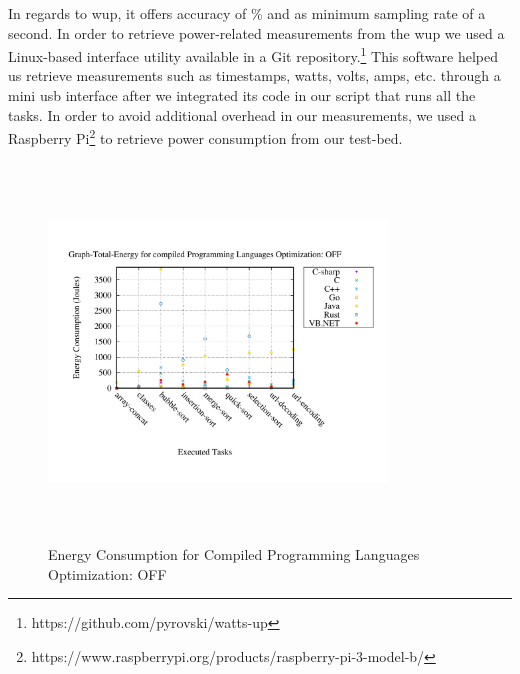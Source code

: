 In regards to {\sc wup}, it offers accuracy of \% and 
as minimum sampling rate of a second. 
In order to retrieve power-related measurements from the {\sc wup} 
we used a Linux-based interface utility available in a Git 
repository.\footnote{https://github.com/pyrovski/watts-up}
This software helped us retrieve measurements such as timestamps, 
watts, volts, amps, etc. through a mini {\sc usb} interface after 
we integrated its code in our script that runs all the tasks. 
In order to avoid additional overhead in our measurements, we 
used a Raspberry Pi\footnote{https://www.raspberrypi.org/products/raspberry-pi-3-model-b/} 
to retrieve power consumption from our test-bed.  

\begin{figure}
	\centering
	\includegraphics[width=9cm,height=10cm,keepaspectratio]{"Graph_Graph-Total-Energy_compiled_Optimization_OFF"}
	\caption{ Energy Consumption for Compiled Programming Languages Optimization: OFF}
	\label{Compiled with No Optimization Total}
\end{figure}


